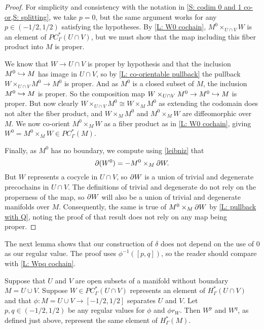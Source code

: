 \begin{proof}
	For simplicity and consistency with the notation in \cref{S: codim 0 and 1 co-or,S: splitting}, we take $p = 0$, but the same argument works for any $p \in (-1/2, 1/2)$ satisfying the hypotheses.
	By \cref{L: W0 cochain}, $M^0 \times_{U\cap V} W$ is an element of $PC^*_\Gamma(U \cap V)$, but we must show that the map including this fiber product into $M$ is proper.

	We know that $W \to U \cap V$ is proper by hypothesis and that the inclusion $M^0 \hookrightarrow M$ has image in $U \cap V$, so by \cref{L: co-orientable pullback} the pullback $W \times_{U \cap V} M^0 \to M^0$ is proper.
	And as $M^0$ is a closed subset of $M$, the inclusion $M^0 \hookrightarrow M$ is proper.
	So the composition map $W \times_{U \cap V} M^0 \to M^0 \hookrightarrow M$ is proper.
	But now clearly $W \times_{U \cap V} M^0 \cong W \times_M M^0$ as extending the codomain does not alter the fiber product, and $W \times_M M^0$ and $M^0 \times_M W$ are diffeomorphic over $M$.
	We now co-orient $M^0 \times_M W$ as a fiber product as in \cref{L: W0 cochain}, giving $W^0 = M^0 \times_M W \in PC^*_\Gamma(M)$.

	Finally, as $M^0$ has no boundary, we compute using \cref{leibniz} that
	$$\partial (W^0) = - M^0 \times_{M} \partial W.$$
	But $W$ represents a cocycle in $U \cap V$, so $\partial W$ is a union of trivial and degenerate precochains in $U \cap V$.
	The definitions of trivial and degenerate do not rely on the properness of the map, so $\partial W$ will also be a union of trivial and degenerate manifolds over $M$.
	Consequently, the same is true of $M^0 \times_{M} \partial W$ by \cref{L: pullback with Q}, noting the proof of that result does not rely on any map being proper.
\end{proof}

The next lemma shows that our construction of $\delta$ does not depend on the use of $0$ as our regular value.
The proof uses $\phi^{-1}([p,q])$, so the reader should compare with \cref{L: Wpq cochain}.

\begin{lemma}\label{L: different point}
	Suppose that $U$ and $V$ are open subsets of a manifold without boundary $M = U \cup V$.
	Suppose $W \in PC^*_\Gamma(U \cap V)$ represents an element of $H^*_\Gamma(U \cap V)$ and that $\phi \colon M = U \cup V \to [-1/2,1/2]$ separates $U$ and $V$.
	Let $p, q\in (-1/2,1/2)$ be any regular values for $\phi$ and $\phi r_W$.
	Then $W^p$ and $W^q$, as defined just above, represent the same element of $H^*_\Gamma(M)$.
\end{lemma}

